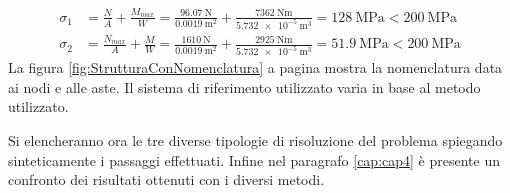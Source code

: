 \begin{align*}
    \sigma_1 &= \frac{N}{A} + \frac{M_{max}}{W} = \frac{\SI{96.07}{\newton}}{\SI{0.0019}{\metre\squared}} + \frac{\SI{7362}{\newton\metre}}{\SI{5.732e-5}{\metre\cubed}} = \SI{128}{\mega\pascal}< \SI{200}{\mega\pascal}\\
    \sigma_2 &= \frac{N_{max}}{A} + \frac{M}{W} = \frac{\SI{1610}{\newton}}{\SI{0.0019}{\metre\squared}} + \frac{\SI{2925}{\newton\metre}}{\SI{5.732e-5}{\metre\cubed}} =\SI{51.9}{\mega\pascal} < \SI{200}{\mega\pascal}
\end{align*}
La figura \ref{fig:StrutturaConNomenclatura} a pagina \pageref{fig:StrutturaConNomenclatura} mostra la nomenclatura data ai nodi e alle aste. Il sistema di riferimento utilizzato varia in base al metodo utilizzato.

Si elencheranno ora le tre diverse tipologie di risoluzione del problema spiegando sinteticamente i passaggi effettuati. 
Infine nel paragrafo \ref{cap:cap4} è presente un confronto dei risultati ottenuti con i diversi metodi.

	
    
    
\pagebreak
{}

